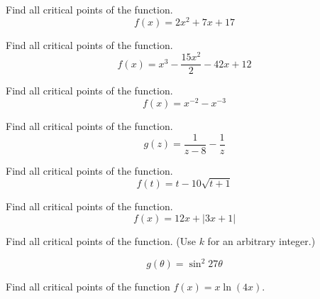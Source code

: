 \documentclass[12pt,addpoints, answers, fleqn]{exam}
\begin{document}
\begin{teacher}
\begin{questions}
\question 	%

Find all critical points of the function.
\[
f\left(x\right) = 2x^2 + 7x + 17
\]
\begin{solution}
\end{solution}


\question 	%

Find all critical points of the function.
\[
f\left(x\right) = x^3 -  \frac{15x^2}{2} - 42x + 12
\]
 \begin{solution}
\end{solution}
\question 	%

Find all critical points of the function.
\[
f\left(x\right) = x^{-2} - x^{-3}
\]
\begin{solution}
\end{solution}

\question 	%

Find all critical points of the function.
\[
g\left(z\right) = \frac{1}{z-8} - \frac{1}{z}
\]
\begin{solution}
\end{solution}
\question 	%

Find all critical points of the function.
\[
f\left(t\right) = t - 10\sqrt{t+1}
\]
\begin{solution}
\end{solution}

\question 	%

Find all critical points of the function.
\[
f\left(x\right) = 12x + \left| 3x + 1 \right|
\]
\begin{solution}
\end{solution}

\question 	%

Find all critical points of the function. (Use $k$ for an arbitrary integer.)

\[
g\left( \theta \right) = \sin^2 27 \theta
\]
\begin{solution}
\end{solution}
\question 	%



Find all critical points of the function $f\left(x\right) = x \ln \left(4x\right)$.
 \begin{solution}
\end{solution}
\question 	%


\end{questions}
\end{teacher}
\end{document}
